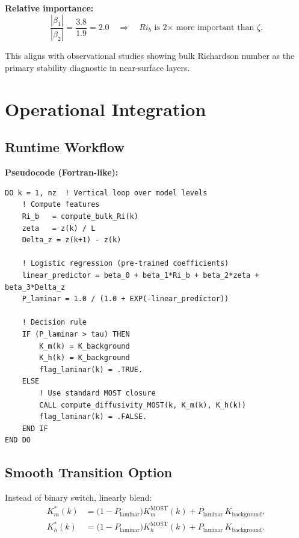 \documentclass[11pt]{article}
\begin{document}
\textbf{Relative importance:}
\begin{equation}
\frac{|\beta_1|}{|\beta_2|} = \frac{3.8}{1.9} = 2.0 \quad \Rightarrow \quad Ri_b \text{ is 2× more important than } \zeta.
\label{eq:relative_importance}
\end{equation}

This aligns with observational studies showing bulk Richardson number as the primary stability diagnostic in near-surface layers.

\section{Operational Integration}

\subsection{Runtime Workflow}

\textbf{Pseudocode (Fortran-like):}
\begin{verbatim}
DO k = 1, nz  ! Vertical loop over model levels
    ! Compute features
    Ri_b   = compute_bulk_Ri(k)
    zeta   = z(k) / L
    Delta_z = z(k+1) - z(k)
    
    ! Logistic regression (pre-trained coefficients)
    linear_predictor = beta_0 + beta_1*Ri_b + beta_2*zeta + beta_3*Delta_z
    P_laminar = 1.0 / (1.0 + EXP(-linear_predictor))
    
    ! Decision rule
    IF (P_laminar > tau) THEN
        K_m(k) = K_background
        K_h(k) = K_background
        flag_laminar(k) = .TRUE.
    ELSE
        ! Use standard MOST closure
        CALL compute_diffusivity_MOST(k, K_m(k), K_h(k))
        flag_laminar(k) = .FALSE.
    END IF
END DO
\end{verbatim}

\subsection{Smooth Transition Option}

Instead of binary switch, linearly blend:
\begin{align}
K_m^*(k) &= \big(1 - P_{\text{laminar}}\big) K_m^{\text{MOST}}(k) + P_{\text{laminar}} \, K_{\text{background}}, \label{eq:smooth_transition_m} \\
K_h^*(k) &= \big(1 - P_{\text{laminar}}\big) K_h^{\text{MOST}}(k) + P_{\text{laminar}} \, K_{\text{background}}. \label{eq:smooth_transition_h}
\end{align}
\end{document}
